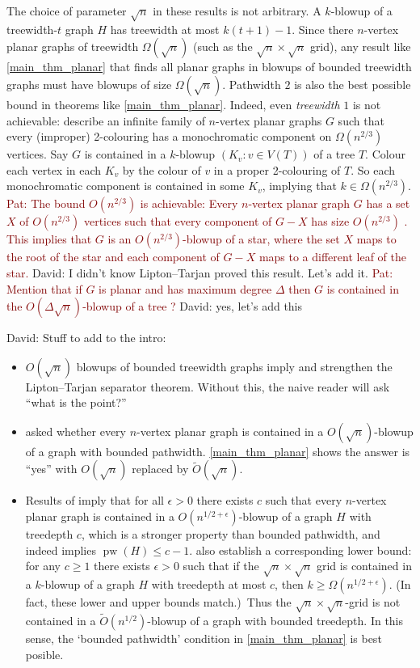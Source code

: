 \documentclass{patmorin}
\renewcommand{\geq}{\geqslant}
\renewcommand{\leq}{\leqslant}
\newcommand{\david}[1]{{\color{orange} David: #1}}
\newcommand{\pat}[1]{\textcolor{Maroon}{Pat: #1}}
\DeclareMathOperator{\pw}{pw}
\begin{document}
The choice of parameter $\sqrt{n}$ in these results is not arbitrary. A $k$-blowup of a treewidth-$t$ graph $H$ has treewidth at most $k(t+1)-1$.  Since there $n$-vertex planar graphs of treewidth $\Omega(\sqrt{n})$ (such as the $\sqrt{n}\times\sqrt{n}$ grid), any result like \cref{main_thm_planar} that finds all planar graphs in blowups of bounded treewidth graphs must have blowups of size $\Omega(\sqrt{n})$.  Pathwidth $2$ is also the best possible bound in theorems like  \cref{main_thm_planar}.  Indeed, even \emph{treewidth} $1$ is not achievable:  \citet{LMST08} describe an infinite family of $n$-vertex planar graphs $G$ such that every (improper) 2-colouring has a monochromatic component on $\Omega(n^{2/3})$ vertices. Say $G$ is contained in a $k$-blowup $(K_v:v\in V(T))$ of a tree $T$. Colour each vertex in each $K_v$ by the colour of $v$ in a proper 2-colouring of $T$. So each monochromatic component is contained in some $K_v$, implying that $k\in\Omega(n^{2/3})$.  \pat{The bound $O(n^{2/3})$ is achievable: Every $n$-vertex planar graph $G$ has a set $X$ of $O(n^{2/3})$ vertices such that every component of $G-X$ has size $O(n^{2/3})$ \cite{lipton.tarjan:applications}.  This implies that $G$ is an $O(n^{2/3})$-blowup of a star, where the set $X$ maps to the root of the star and each component of $G-X$ maps to a different leaf of the star.} \david{I didn't know Lipton--Tarjan proved this result. Let's add it.}
\pat{Mention that if $G$ is planar and has maximum degree $\Delta$ then $G$ is contained in the $O(\Delta\sqrt{n})$-blowup of a tree \cite{ding.oporowski:some}?} \david{yes, let's add this}



\david{Stuff to add to the intro:
\begin{itemize}
\item $O(\sqrt{n})$ blowups of bounded treewidth graphs imply and strengthen the Lipton--Tarjan separator theorem. Without this, the naive reader will ask ``what is the point?''
\item \citet{distel.dujmovic.ea:product} asked whether every $n$-vertex planar graph is contained in a $O(\sqrt{n})$-blowup of a graph with bounded pathwidth. \cref{main_thm_planar} shows the answer is ``yes'' with $O(\sqrt{n})$ replaced by $\tilde{O}(\sqrt{n})$.
\item Results of \citet[Theorem~5]{DvoWoo} imply that for all $\epsilon>0$ there exists $c$ such that every $n$-vertex planar graph is contained in a $O(n^{1/2+\epsilon})$-blowup of a graph $H$ with treedepth $c$, which is a  stronger property than bounded pathwidth, and indeed implies $\pw(H)\leq c-1$. \citet[Theorem~19]{DvoWoo} also establish a corresponding lower bound: for any $c\geq 1$ there exists $\epsilon>0$ such that if the $\sqrt{n}\times\sqrt{n}$ grid is contained in a $k$-blowup of a graph $H$ with treedepth at most $c$, then $k\geq\Omega(n^{1/2+\epsilon})$. (In fact, these lower and upper bounds match.)\ Thus the $\sqrt{n}\times \sqrt{n}$-grid is not contained in a $\tilde{O}(n^{1/2})$-blowup of a graph with bounded treedepth. In this sense, the `bounded pathwidth' condition in \cref{main_thm_planar} is best posible.
\end{itemize}}
\end{document}

